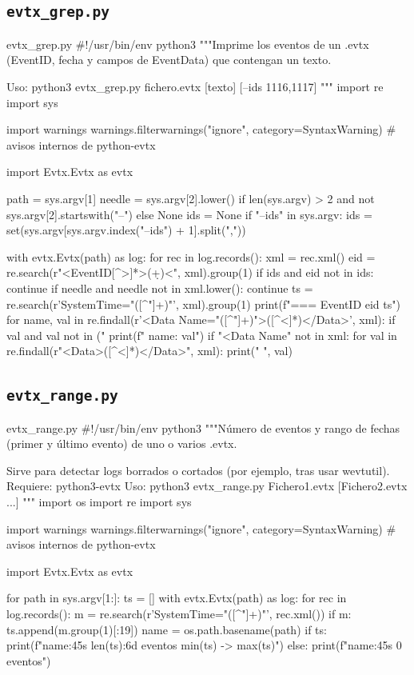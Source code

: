 \documentclass[11pt,a4paper]{article}
\begin{document}
\subsection{\texttt{evtx\_grep.py}}
\begin{codigopython}{evtx\_grep.py}
#!/usr/bin/env python3
"""Imprime los eventos de un .evtx (EventID, fecha y campos de EventData) que contengan un texto.

Uso: python3 evtx_grep.py fichero.evtx [texto] [--ids 1116,1117]
"""
import re
import sys

import warnings
warnings.filterwarnings("ignore", category=SyntaxWarning)  # avisos internos de python-evtx

import Evtx.Evtx as evtx

path = sys.argv[1]
needle = sys.argv[2].lower() if len(sys.argv) > 2 and not sys.argv[2].startswith("--") else None
ids = None
if "--ids" in sys.argv:
    ids = set(sys.argv[sys.argv.index("--ids") + 1].split(","))

with evtx.Evtx(path) as log:
    for rec in log.records():
        xml = rec.xml()
        eid = re.search(r"<EventID[^>]*>(\d+)<", xml).group(1)
        if ids and eid not in ids:
            continue
        if needle and needle not in xml.lower():
            continue
        ts = re.search(r'SystemTime="([^"]+)"', xml).group(1)
        print(f"=== EventID {eid}  {ts}")
        for name, val in re.findall(r'<Data Name="([^"]+)">([^<]*)</Data>', xml):
            if val and val not in ("%
                print(f"   {name}: {val}")
        if "<Data Name" not in xml:
            for val in re.findall(r"<Data>([^<]*)</Data>", xml):
                print("   ", val)
\end{codigopython}

\subsection{\texttt{evtx\_range.py}}
\begin{codigopython}{evtx\_range.py}
#!/usr/bin/env python3
"""Número de eventos y rango de fechas (primer y último evento) de uno o varios .evtx.

Sirve para detectar logs borrados o cortados (por ejemplo, tras usar wevtutil).
Requiere: python3-evtx
Uso: python3 evtx_range.py Fichero1.evtx [Fichero2.evtx ...]
"""
import os
import re
import sys

import warnings
warnings.filterwarnings("ignore", category=SyntaxWarning)  # avisos internos de python-evtx

import Evtx.Evtx as evtx

for path in sys.argv[1:]:
    ts = []
    with evtx.Evtx(path) as log:
        for rec in log.records():
            m = re.search(r'SystemTime="([^"]+)"', rec.xml())
            if m:
                ts.append(m.group(1)[:19])
    name = os.path.basename(path)
    if ts:
        print(f"{name:45s} {len(ts):6d} eventos   {min(ts)}  ->  {max(ts)}")
    else:
        print(f"{name:45s}      0 eventos")
\end{codigopython}
\end{document}
